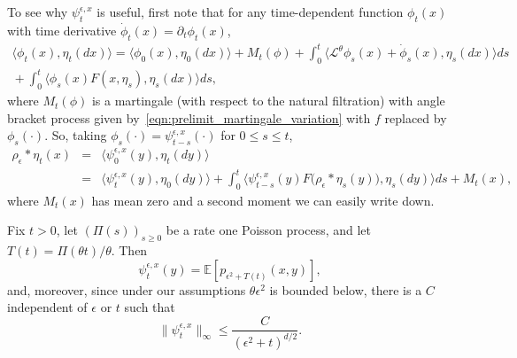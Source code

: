 \documentclass[EJP]{ejpecp} %
\newcommand{\IE}{\mathbb E}
\begin{document}
To see why $\psi_t^{\epsilon,x}$ is useful,
first note that for any time-dependent function $\phi_t(x)$
with time derivative $\dot \phi_t(x) = \partial_t \phi_t(x)$,
\begin{multline}
\label{time dep mg prob}
    \langle \phi_t(x), \eta_t(dx) \rangle
    = 
    \langle \phi_0(x), \eta_0(dx) \rangle
    +
    M_t(\phi)
    +
    \int_0^t \big\langle \mathcal{L}^\theta \phi_s(x) 
        + \dot \phi_s(x), \eta_s(dx) \big\rangle ds
    \\  {}
    +
    \int_{0}^t \big\langle \phi_s(x) F(x, \eta_s) , \eta_s(dx) \big\rangle ds ,
\end{multline}
where $M_t(\phi)$ is a martingale (with respect to the natural filtration)
with angle bracket process given by~\eqref{eqn:prelimit_martingale_variation}
with $f$ replaced by $\phi_s(\cdot)$.
So, taking $\phi_s(\cdot)=\psi_{t-s}^{\epsilon,x}(\cdot)$ for $0 \le s \le t$,
\begin{eqnarray}
    \nonumber
    \rho_\epsilon*\eta_t(x)&=&\langle\psi^{\epsilon,x}_0(y),\eta_t(dy)\rangle
    \\
    &=&\langle\psi^{\epsilon,x}_t(y),\eta_0(dy)\rangle
    +\int_0^t\big\langle\psi^{\epsilon,x}_{t-s}(y)
    F\big(\rho_\epsilon*\eta_s(y)\big), \eta_s(dy)\big\rangle ds
    +M_t(x),
    \label{expn rhoepsilon} 
\end{eqnarray}
where $M_t(x)$ has mean zero and a second moment we can easily write down.


\begin{lemma} \label{PsiBoundHS}
    Fix $t>0$,
    let $(\Pi(s))_{s \ge 0}$ be a rate one Poisson process,
    and let $T(t) = \Pi(\theta t) / \theta$.
    Then
    \[
        \psi^{\epsilon,x}_t(y)
        =
        \IE\left[ p_{\epsilon^2+T(t)}(x,y)\right],
    \]
    and, moreover,
    since under our assumptions $\theta \epsilon^2$ is bounded below,
    there is a $C$ independent of $\epsilon$ or $t$ such that
    \[
        \| \psi^{\epsilon,x}_t \|_\infty
        \leq
        \frac{C}{(\epsilon^2 + t)^{d/2}} .
    \]
\end{lemma}
\end{document}
